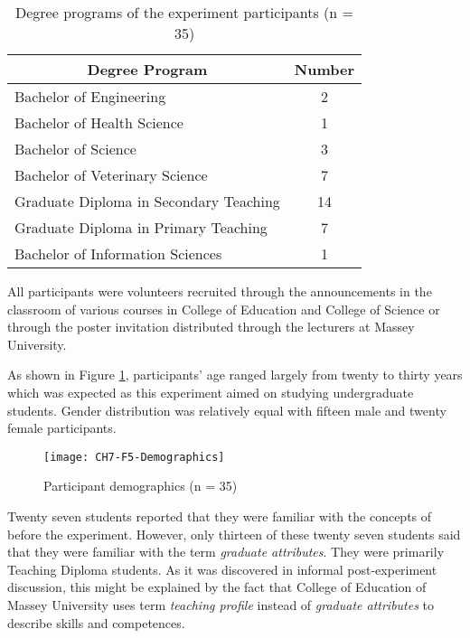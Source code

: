 \begin{table}[htb]
  \begin{center}
    \begin{tabular}{| l | c |}
    \hline
     \multicolumn{1}{|c|}{\textbf{Degree Program}} &
     \multicolumn{1}{c|}{\textbf{Number}} \\
     \hline
     Bachelor of Engineering & 2 \\ \hline
     Bachelor of Health Science & 1 \\ \hline
     Bachelor of Science & 3 \\ \hline
     Bachelor of Veterinary Science & 7 \\ \hline
     Graduate Diploma in Secondary Teaching & 14 \\ \hline
     Graduate Diploma in Primary Teaching & 7 \\ \hline
     Bachelor of Information Sciences & 1 \\ \hline
    \end{tabular}
  \end{center}
  \caption{Degree programs of the experiment participants (n = 35)}
  \label{tab:degree}
\end{table}

All participants were volunteers recruited through the announcements in the
classroom of various courses in College of Education and College of Science or
through the poster invitation distributed through the lecturers at Massey
University.

As shown in Figure \ref{fig:demograph}, participants' age ranged largely from
twenty to thirty years which was expected as this experiment aimed on studying
undergraduate students. Gender distribution was relatively equal with fifteen
male and twenty female participants.

\begin{figure}[htb]
\centering
\texttt{[image: CH7-F5-Demographics]}
\caption{Participant demographics (n = 35)}
\label{fig:demograph}
\end{figure}

Twenty seven students reported that they were familiar with the concepts
of \LLLs before the experiment. However, only thirteen of these twenty seven
students said that they were familiar with the term \textit{graduate
attributes}. They were primarily Teaching Diploma students. As it was discovered
in informal post-experiment discussion, this might be explained by the fact that
College of Education of Massey University uses term \textit{teaching profile}
instead of \textit{graduate attributes} to describe \LLLs skills and
competences.


